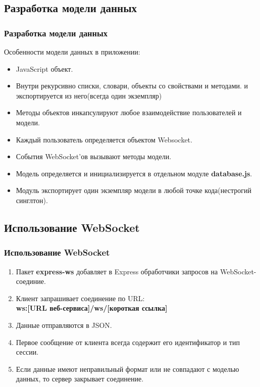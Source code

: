 \documentclass{beamer}
\begin{document}
\subsection{Разработка модели данных}
\begin{frame}
\frametitle{Разработка модели данных}
	Особенности модели данных в приложении:
	\begin{itemize}
		\item JavaScript объект.
		\item Внутри рекурсивно списки, словари, объекты со свойствами и методами.
		 и экспортируется из него(всегда один экземпляр)
		\item Методы объектов инкапсулируют любое взаимодействие пользователей и модели.
		\item Каждый пользователь определяется объектом Websocket.
		\item События WebSocket'ов вызывают методы модели. 
		\item Модель определяется и инициализируется в отдельном модуле \textbf{database.js}.
		\item Модуль экспортирует один экземпляр модели в любой точке кода(нестрогий синглтон).
	\end{itemize}
\end{frame}





\subsection{Использование WebSocket}
\begin{frame}
\frametitle{Использование WebSocket}
	\begin{enumerate}
		\item Пакет \textbf{express-ws} добавляет в Express обработчики запросов на WebSocket-соединие.
		\item Клиент запрашивает соединение по URL:\\ \textbf{ws:[URL веб-сервиса]/ws/[короткая ссылка]}	  
		\item Данные отправляются в JSON. 
		\item Первое сообщение от клиента всегда содержит его идентификатор и тип сессии. 
		\item Если данные имеют неправильный формат или не совпадают с моделью данных, то сервер закрывает соединение.
	\end{enumerate}
\end{frame}
\end{document}
